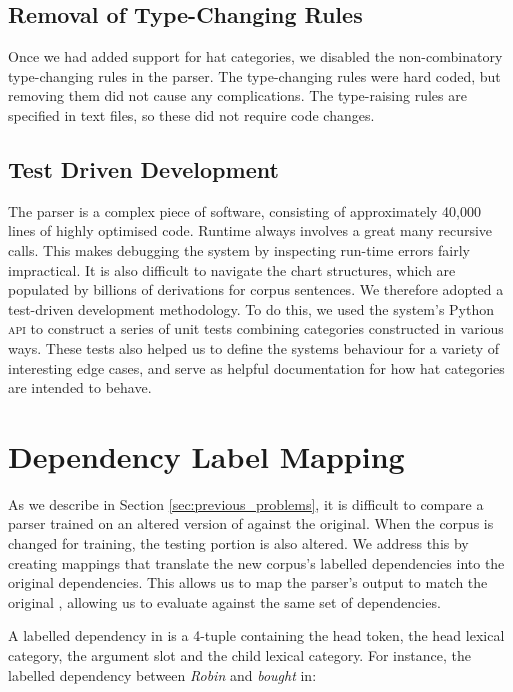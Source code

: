 \subsection{Removal of Type-Changing Rules}

Once we had added support for hat categories, we disabled the non-combinatory
type-changing rules in the parser. The type-changing rules were hard
coded, but removing them did not cause any complications. The type-raising rules
are specified in text files, so these did not require code changes.

\subsection{Test Driven Development}

The \candc parser is a complex piece of software, consisting of approximately
40,000 lines of highly optimised \cpp code. Runtime always involves a great many
recursive calls. This makes debugging the system by inspecting run-time errors
fairly impractical. It is also difficult to navigate the chart structures, which
are populated by billions of derivations for corpus sentences. We therefore
adopted a test-driven development methodology. To do this, we used the system's
Python \textsc{api} to construct a series of unit tests combining categories
constructed in various ways. These tests also helped us to define the systems
behaviour for a variety of interesting edge cases, and serve as helpful
documentation for how hat categories are intended to behave.

\section{Dependency Label Mapping}
\label{sec:dependency_mapping}
As we describe in Section \ref{sec:previous_problems}, it is difficult to
compare a parser trained on an altered version of \ccgbank against the original.
When the corpus is changed for training, the testing portion is also altered. We
address this by creating mappings that translate the new corpus's labelled
dependencies into the original \ccgbank dependencies. This allows us to map the
parser's output to match the original \ccgbank, allowing us to evaluate against
the same set of dependencies.

A labelled dependency in \ccgbank is a 4-tuple containing the head token, the
head lexical category, the argument slot and the child lexical category. For
instance, the labelled dependency between \emph{Robin} and \emph{bought} in:

